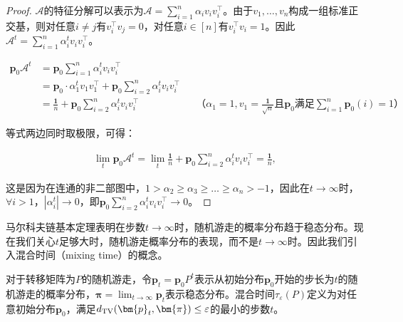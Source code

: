     \begin{proof}
                    
        $\mathcal{A}$的特征分解可以表示为$\mathcal{A}=\sum_{i=1}^n{\alpha_iv_iv_i^{\top}}$。由于$v_1,\dots,v_n$构成一组标准正交基，则对任意$i\ne j$有$v_i^{\top}v_j=0$，对任意$i\in[n]$有$v_i^{\top}v_i=1$。因此$\mathcal{A}^t=\sum_{i=1}^n{\alpha_i^tv_iv_i^{\top}}$。

        \begin{align*}
            \bm{p}_0\mathcal{A}^t&=\bm{p}_0\sum_{i=1}^n{\alpha_i^tv_iv_i^{\top}}\\
            &=\bm{p}_0\cdot \alpha_1^tv_1v_1^{\top}+\bm{p}_0\sum_{i=2}^n{\alpha_i^tv_iv_i^{\top}}\\
            &=\frac{\bm{1}}{n}+\bm{p}_0\sum_{i=2}^n{\alpha_i^tv_iv_i^{\top}}&&\text{（$\alpha_1=1,v_1=\frac{\bm{1}}{\sqrt{n}}$且$\bm{p}_0$满足$\sum_{i=1}^n\bm{p}_0(i)=1$）}
        \end{align*}

        等式两边同时取极限，可得：
                    
        \begin{align*}
            \lim_t \bm{p}_0\mathcal{A}^t =\lim_t \frac{\bm{1}}{n}+\bm{p}_0\sum_{i=2}^n{\alpha_i^tv_iv_i^{\top}}=\frac{\bm{1}}{n},
        \end{align*}
        
        这是因为在连通的非二部图中，$1>\alpha_2\ge \alpha_3\ge \dots\ge \alpha_n>-1$，因此在$t\to \infty$时，$\forall i>1$，${|\alpha_i^t|}\to 0$，即$\bm{p}_0\sum_{i=2}^n{\alpha_i^tv_iv_i^{\top}}\to 0$。
                    
    \end{proof}

    马尔科夫链基本定理表明在步数$t\to \infty$时，随机游走的概率分布趋于稳态分布。现在我们关心$t$足够大时，随机游走概率分布的表现，而不是$t\to \infty$时。因此我们引入混合时间（mixing time）的概念。

    \begin{definition}[混合时间]
        \label{defn:mixing-time}
        对于转移矩阵为$P$的随机游走，令$\bm{p}_t=\bm{p}_0P^t$表示从初始分布$\bm{p}_0$开始的步长为$t$的随机游走的概率分布，$\bm{\pi}=\lim_{t \to \infty} \bm{p}_t$表示稳态分布。混合时间$\tau_{\varepsilon}(P)$定义为对任意初始分布$\bm{p}_0$，满足$d_{\textup{TV}}(\bm{p}_t,\bm{\pi})\le \varepsilon$的最小的步数$t$。
    \end{definition}

